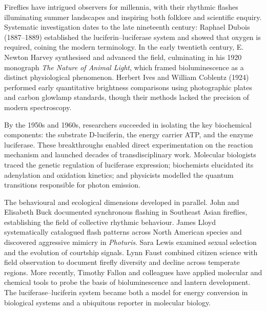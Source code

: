 \begin{historical}
Fireflies have intrigued observers for millennia, with their rhythmic flashes illuminating summer landscapes and inspiring both folklore and scientific enquiry. Systematic investigation dates to the late nineteenth century: Raphael Dubois (1887–1889) established the luciferin–luciferase system and showed that oxygen is required, coining the modern terminology. In the early twentieth century, E. Newton Harvey synthesised and advanced the field, culminating in his 1920 monograph \emph{The Nature of Animal Light}, which framed bioluminescence as a distinct physiological phenomenon. Herbert Ives and William Coblentz (1924) performed early quantitative brightness comparisons using photographic plates and carbon glowlamp standards, though their methods lacked the precision of modern spectroscopy.

By the 1950s and 1960s, researchers succeeded in isolating the key biochemical components: the substrate D-luciferin, the energy carrier ATP, and the enzyme luciferase. These breakthroughs enabled direct experimentation on the reaction mechanism and launched decades of transdisciplinary work. Molecular biologists traced the genetic regulation of luciferase expression; biochemists elucidated its adenylation and oxidation kinetics; and physicists modelled the quantum transitions responsible for photon emission.

The behavioural and ecological dimensions developed in parallel. John and Elisabeth Buck documented synchronous flashing in Southeast Asian fireflies, establishing the field of collective rhythmic behaviour. James Lloyd systematically catalogued flash patterns across North American species and discovered aggressive mimicry in \emph{Photuris}. Sara Lewis examined sexual selection and the evolution of courtship signals. Lynn Faust combined citizen science with field observation to document firefly diversity and decline across temperate regions. More recently, Timothy Fallon and colleagues have applied molecular and chemical tools to probe the basis of bioluminescence and lantern development. The luciferase–luciferin system became both a model for energy conversion in biological systems and a ubiquitous reporter in molecular biology.
\end{historical}



